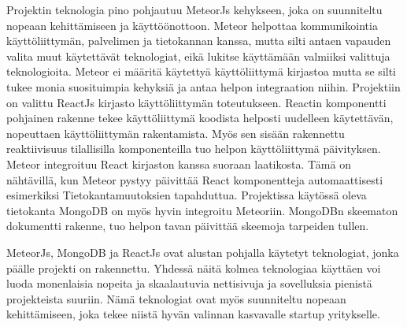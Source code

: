\documentclass[11pt,a4paper,titlepage,oneside]{article}
\begin{document}
Projektin teknologia pino pohjautuu MeteorJs kehykseen, joka on suunniteltu nopeaan kehittämiseen ja käyttöönottoon.
Meteor helpottaa kommunikointia käyttöliittymän, palvelimen ja tietokannan kanssa, 
mutta silti antaen vapauden valita muut käytettävät teknologiat, eikä lukitse käyttämään valmiiksi valittuja teknologioita.
Meteor ei määritä käytettyä käyttöliittymä kirjastoa mutta se silti tukee monia suosituimpia kehyksiä ja antaa helpon integraation niihin.
Projektiin on valittu ReactJs kirjasto käyttöliittymän toteutukseen.
Reactin komponentti pohjainen rakenne tekee käyttöliittymä koodista helposti uudelleen käytettävän, nopeuttaen käyttöliittymän rakentamista. 
Myös sen sisään rakennettu reaktiivisuus tilallisilla komponenteilla tuo helpon käyttöliittymä päivityksen.
Meteor integroituu React kirjaston kanssa suoraan laatikosta.
Tämä on nähtävillä, kun Meteor pystyy päivittää React komponentteja automaattisesti esimerkiksi Tietokantamuutoksien tapahduttua. 
Projektissa käytössä oleva tietokanta MongoDB on myös hyvin integroitu Meteoriin.
MongoDBn skeematon dokumentti rakenne, tuo helpon tavan päivittää skeemoja tarpeiden tullen.
\medskip


MeteorJs, MongoDB ja ReactJs ovat alustan pohjalla käytetyt teknologiat, jonka päälle projekti on rakennettu.
Yhdessä näitä kolmea teknologiaa käyttäen voi luoda monenlaisia nopeita ja skaalautuvia nettisivuja ja sovelluksia pienistä projekteista suuriin.
Nämä teknologiat ovat myös suunniteltu nopeaan kehittämiseen, joka tekee niistä hyvän valinnan kasvavalle startup yritykselle.
\medskip









\newpage
{}                %




\newpage
{}%






\newpage
{}        %
\end{document}
